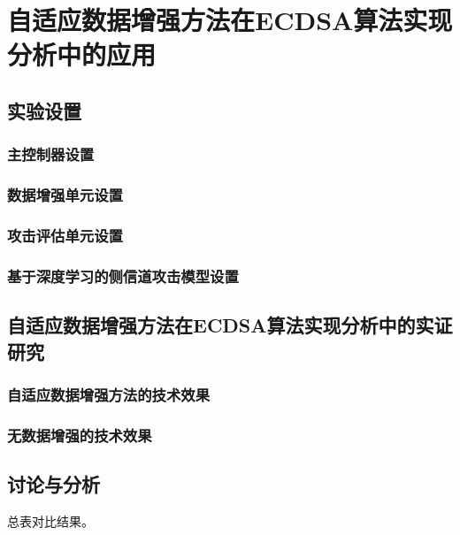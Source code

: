 {	\section{自适应数据增强方法在ECDSA算法实现分析中的应用}
	\subsection{实验设置}
	\subsubsection{主控制器设置}
	\subsubsection{数据增强单元设置}
	\subsubsection{攻击评估单元设置}
	\subsubsection{基于深度学习的侧信道攻击模型设置}
	\subsection{自适应数据增强方法在ECDSA算法实现分析中的实证研究}
	\subsubsection{自适应数据增强方法的技术效果}
	\subsubsection{无数据增强的技术效果}
	\subsection{讨论与分析}
	总表对比结果。
}